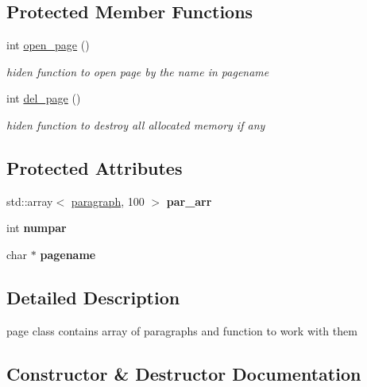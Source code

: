 \subsection*{Protected Member Functions}
\begin{DoxyCompactItemize}
\item 
\mbox{\label{classpage_af3155afb8335de30b52d4280f390c398}} 
int \hyperlink{classpage_af3155afb8335de30b52d4280f390c398}{open\+\_\+page} ()
\begin{DoxyCompactList}\small\item\em hiden function to open page by the name in pagename \end{DoxyCompactList}\item 
\mbox{\label{classpage_acb20752136c88c804d6f3f6ef0569737}} 
int \hyperlink{classpage_acb20752136c88c804d6f3f6ef0569737}{del\+\_\+page} ()
\begin{DoxyCompactList}\small\item\em hiden function to destroy all allocated memory if any \end{DoxyCompactList}\end{DoxyCompactItemize}
\subsection*{Protected Attributes}
\begin{DoxyCompactItemize}
\item 
\mbox{\label{classpage_ac0fc49e219397088606ebdaa04e5728f}} 
std\+::array$<$ \hyperlink{classparagraph}{paragraph}, 100 $>$ {\bfseries par\+\_\+arr}
\item 
\mbox{\label{classpage_ac98ed4bbad67f1981e117ccc488cc1b7}} 
int {\bfseries numpar}
\item 
\mbox{\label{classpage_a362475983bb94ce58bb55d49c2646ec9}} 
char $\ast$ {\bfseries pagename}
\end{DoxyCompactItemize}


\subsection{Detailed Description}
page class contains array of paragraphs and function to work with them 

\subsection{Constructor \& Destructor Documentation}
\mbox{\label{classpage_a70d21de949a1787fb6db224844b8dce9}} 

